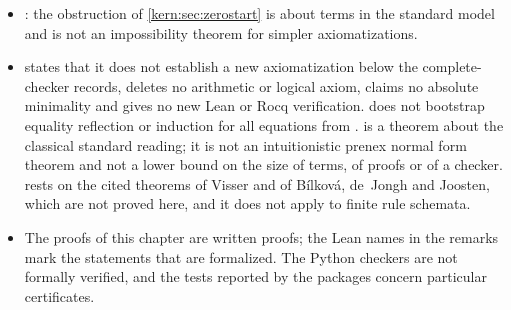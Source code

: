\begin{itemize}
 independence result is inferred from either.
\item {}: the obstruction of
 \cref{kern:sec:zerostart} is about terms in the standard model and is not
 an impossibility theorem for simpler axiomatizations.
\item {} states that it does not establish a new
 axiomatization below the complete-checker records, deletes no arithmetic
 or logical axiom, claims no absolute minimality and gives no new Lean or
 Rocq verification.   does not bootstrap equality
 reflection or induction for all equations from .
  is a theorem about the classical standard reading;
 it is not an intuitionistic prenex normal form theorem and not a lower
 bound on the size of terms, of proofs or of a checker.
  rests on the cited theorems of Visser and of
 B\'ilkov\'a, de~Jongh and Joosten, which are not proved here, and it does
 not apply to finite rule schemata.
\item The proofs of this chapter are written proofs; the Lean names in the
 remarks mark the statements that are formalized.  The Python checkers are
 not formally verified, and the tests reported by the packages concern
 particular certificates.
\end{itemize}
